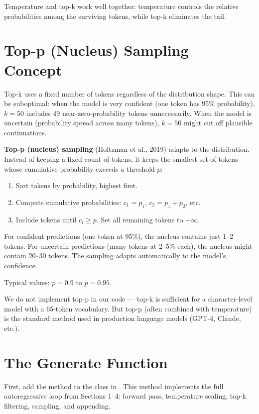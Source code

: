 Temperature and top-k work well together: temperature controls the relative probabilities among the surviving tokens, while top-k eliminates the tail.

\section{Top-p (Nucleus) Sampling -- Concept}

Top-k uses a fixed number of tokens regardless of the distribution shape. This can be suboptimal: when the model is very confident (one token has 95\% probability), $k = 50$ includes 49 near-zero-probability tokens unnecessarily. When the model is uncertain (probability spread across many tokens), $k = 50$ might cut off plausible continuations.

\textbf{Top-p (nucleus) sampling} (Holtzman et al., 2019) adapts to the distribution. Instead of keeping a fixed count of tokens, it keeps the smallest set of tokens whose cumulative probability exceeds a threshold $p$:

\begin{enumerate}
  \item Sort tokens by probability, highest first.
  \item Compute cumulative probabilities: $c_1 = p_1$, $c_2 = p_1 + p_2$, etc.
  \item Include tokens until $c_i \geq p$. Set all remaining tokens to $-\infty$.
\end{enumerate}

For confident predictions (one token at 95\%), the nucleus contains just 1--2 tokens. For uncertain predictions (many tokens at 2--5\% each), the nucleus might contain 20--30 tokens. The sampling adapts automatically to the model's confidence.

Typical values: $p = 0.9$ to $p = 0.95$.

We do not implement top-p in our code --- top-k is sufficient for a character-level model with a 65-token vocabulary. But top-p (often combined with temperature) is the standard method used in production language models (GPT-4, Claude, etc.).

\section{The Generate Function}

First, add the  method to the  class in . This method implements the full autoregressive loop from Sections 1--4: forward pass, temperature scaling, top-k filtering, sampling, and appending.


